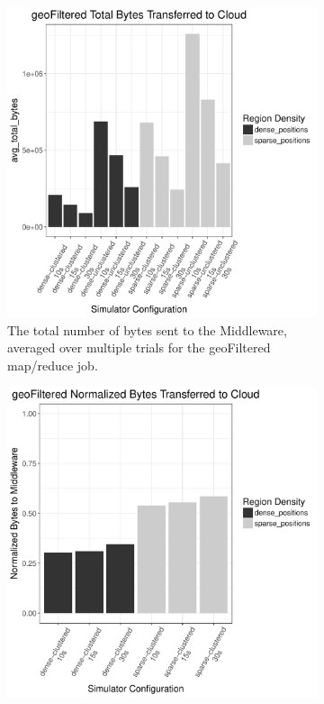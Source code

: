 \documentclass{thesis}
\begin{document}
    \begin{figure}
        \begin{subfigure}[h]{0.45\textwidth}
            \centering
            \includegraphics[width=\textwidth]{binImages/geoFiltered-runplot.pdf}
            \caption{The total number of bytes sent to the Middleware,
            averaged over multiple trials for the geoFiltered map/reduce job.}
        \end{subfigure}
        \begin{subfigure}[h]{0.45\textwidth}
            \centering
            \includegraphics[width=\textwidth]{binImages/geoFiltered-runplot-normalized.pdf}

\end{subfigure}
\end{figure}
\end{document}

